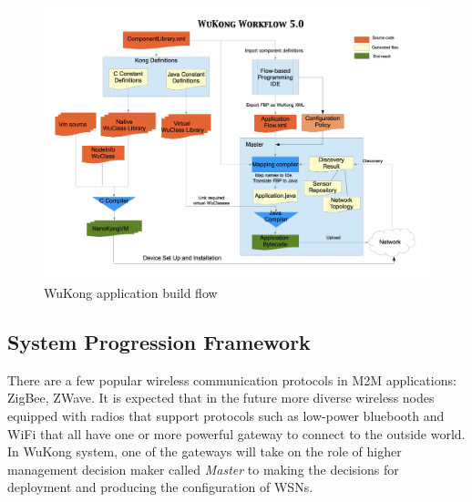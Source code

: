 \begin{figure}[h!]
\centering
    \includegraphics[width=\linewidth]{figures/wukong-flow}
\caption{WuKong application build flow}
\label{fig:wukong-flow}
\end{figure}

\subsection{System Progression Framework}

There are a few popular wireless communication protocols in M2M applications:
ZigBee, ZWave. It is expected that in the future more diverse
wireless nodes equipped with radios that support protocols such as low-power
bluebooth and WiFi that all have one or more powerful gateway to connect to the
outside world. In WuKong system, one of the gateways will take on the role of
higher management decision maker called \emph{Master} to making the decisions for
deployment and producing the configuration of WSNs.


